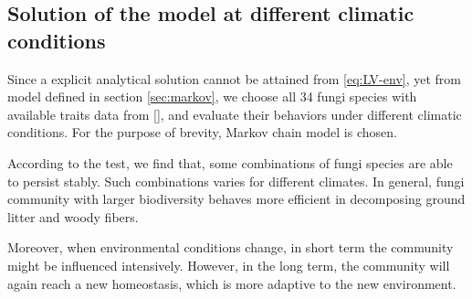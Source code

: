 \subsection{Solution of the model at different climatic conditions}

Since a explicit analytical solution cannot be attained from \eqref{eq:LV-env}, yet from model defined in section \ref{sec:markov}, we choose all 34 fungi species with available traits data from [], and evaluate their behaviors under different climatic conditions. For the purpose of brevity, Markov chain model is chosen.

According to the test, we find that, some combinations of fungi species are able to persist stably. Such combinations varies for different climates. In general, fungi community with larger biodiversity behaves more efficient in decomposing ground litter and woody fibers.

Moreover, when environmental conditions change, in short term the community might be influenced intensively. However, in the long term, the community will again reach a new homeostasis, which is more adaptive to the new environment.
